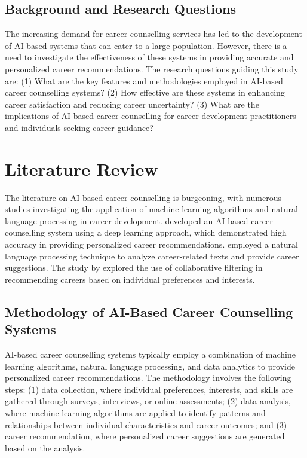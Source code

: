 \documentclass[12pt,a4paper]{article}
\begin{document}
\subsection{Background and Research Questions}
The increasing demand for career counselling services has led to the development of AI-based systems that can cater to a large population. However, there is a need to investigate the effectiveness of these systems in providing accurate and personalized career recommendations. The research questions guiding this study are: (1) What are the key features and methodologies employed in AI-based career counselling systems? (2) How effective are these systems in enhancing career satisfaction and reducing career uncertainty? (3) What are the implications of AI-based career counselling for career development practitioners and individuals seeking career guidance?

\section{Literature Review}
The literature on AI-based career counselling is burgeoning, with numerous studies investigating the application of machine learning algorithms and natural language processing in career development. \citet{kim2019} developed an AI-based career counselling system using a deep learning approach, which demonstrated high accuracy in providing personalized career recommendations. \citet{patel2020} employed a natural language processing technique to analyze career-related texts and provide career suggestions. The study by \citet{lee2018} explored the use of collaborative filtering in recommending careers based on individual preferences and interests.

\subsection{Methodology of AI-Based Career Counselling Systems}
AI-based career counselling systems typically employ a combination of machine learning algorithms, natural language processing, and data analytics to provide personalized career recommendations. The methodology involves the following steps: (1) data collection, where individual preferences, interests, and skills are gathered through surveys, interviews, or online assessments; (2) data analysis, where machine learning algorithms are applied to identify patterns and relationships between individual characteristics and career outcomes; and (3) career recommendation, where personalized career suggestions are generated based on the analysis.
\end{document}
